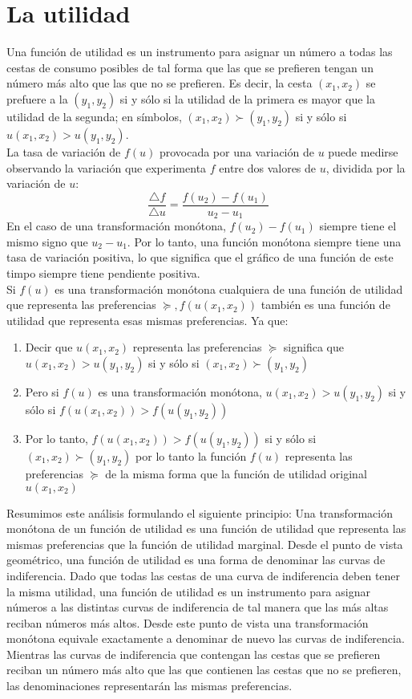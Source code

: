 \documentclass[10pt]{article}
\begin{document}
\part*{\center La utilidad}
Una función de utilidad es un instrumento para asignar un número a todas las cestas de consumo posibles de tal forma que las que se prefieren tengan un número más alto que las que no se prefieren. Es decir, la cesta $(x_1,x_2)$ se prefuere a la $(y_1,y_2)$ si y sólo si la utilidad de la primera es mayor que la utilidad de la segunda; en símbolos, $(x_1,x_2) \succ (y_1,y_2)$ si y sólo si $u(x_1,x_2) > u(y_1,y_2)$.\\
La tasa de variación de $f(u)$ provocada por una variación de $u$ puede medirse observando la variación que experimenta $f$ entre dos valores de $u$, dividida por la variación de $u$: $$\dfrac{\triangle f}{\triangle u}=\dfrac{f(u_2)-f(u_1)}{u_2-u_1}$$ En el caso de una transformación monótona, $f(u_2)-f(u_1)$ siempre tiene el mismo signo que $u_2 - u_1$. Por lo tanto, una función monótona siempre tiene una tasa de variación positiva, lo que significa que el gráfico de una función de este timpo siempre tiene pendiente positiva.\\
Si $f(u)$ es una transformación monótona cualquiera de una función de utilidad que representa las preferencias $\succeq, f(u(x_1,x_2))$ también es una función de utilidad que representa esas mismas preferencias. Ya que:
\begin{enumerate}
    \item Decir que $u(x_1,x_2)$ representa las preferencias $\succeq$ significa que $u(x_1,x_2) > u(y_1,y_2)$ si y sólo si $(x_1,x_2)\succ (y_1,y_2)$
    \item Pero si $f(u)$ es una transformación monótona, $u(x_1,x_2)>u(y_1,y_2)$ si y sólo si $f(u(x_1,x_2))>f(u(y_1,y_2))$ 
    \item Por lo tanto, $f(u(x_1,x_2))>f(u(y_1,y_2))$ si y sólo si $(x_1,x_2)\succ (y_1,y_2)$ por lo tanto la función $f(u)$ representa las preferencias $\succeq$ de la misma forma que la función de utilidad original $u(x_1,x_2)$
\end{enumerate}
Resumimos este análisis formulando el siguiente principio: Una transformación monótona de un función de utilidad es una función de utilidad que representa las mismas preferencias que la función de utilidad marginal.
Desde el punto de vista geométrico, una función de utilidad es una forma de denominar las curvas de indiferencia. Dado que todas las cestas de una curva de indiferencia deben tener la misma utilidad, una función de utilidad es un instrumento para asignar números a las distintas curvas de indiferencia de tal manera que las más altas reciban números más altos. Desde este punto de vista una transformación monótona equivale exactamente a denominar de nuevo las curvas de indiferencia. Mientras las curvas de indiferencia que contengan las cestas que se prefieren reciban un número más alto que las que contienen las cestas que no se prefieren, las denominaciones representarán las mismas preferencias.
\end{document}
